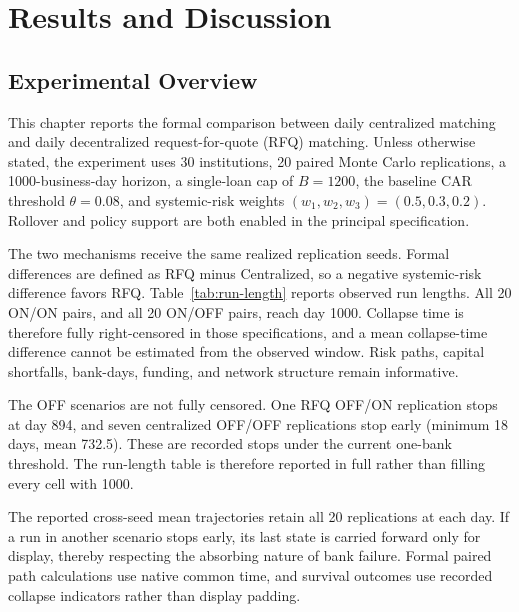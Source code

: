 \chapter{Results and Discussion}

\section{Experimental Overview}

This chapter reports the formal comparison between daily centralized
matching and daily decentralized request-for-quote (RFQ) matching. Unless
otherwise stated, the experiment uses 30 institutions, 20 paired Monte
Carlo replications, a 1000-business-day horizon, a single-loan cap of
\(B=1200\), the baseline CAR threshold \(\theta=0.08\), and systemic-risk
weights \((w_1,w_2,w_3)=(0.5,0.3,0.2)\). Rollover and policy support are
both enabled in the principal specification.

The two mechanisms receive the same realized replication seeds. Formal
differences are defined as RFQ minus Centralized, so a negative
systemic-risk difference favors RFQ. Table~\ref{tab:run-length} reports
observed run lengths. All 20 ON/ON pairs, and all 20 ON/OFF pairs, reach
day 1000. Collapse time is therefore fully right-censored in those
specifications, and a mean collapse-time difference cannot be estimated
from the observed window. Risk paths, capital shortfalls, bank-days,
funding, and network structure remain informative.

The OFF scenarios are not fully censored. One RFQ OFF/ON replication
stops at day 894, and seven centralized OFF/OFF replications stop early
(minimum 18 days, mean 732.5). These are recorded stops under the
current one-bank threshold. The run-length table is
therefore reported in full rather than filling every cell with 1000.

The reported cross-seed mean trajectories retain all 20 replications at
each day. If a run in another scenario stops early, its last state is
carried forward only for display, thereby respecting the absorbing nature
of bank failure. Formal paired path calculations use native common time,
and survival outcomes use recorded collapse indicators rather than
display padding.

